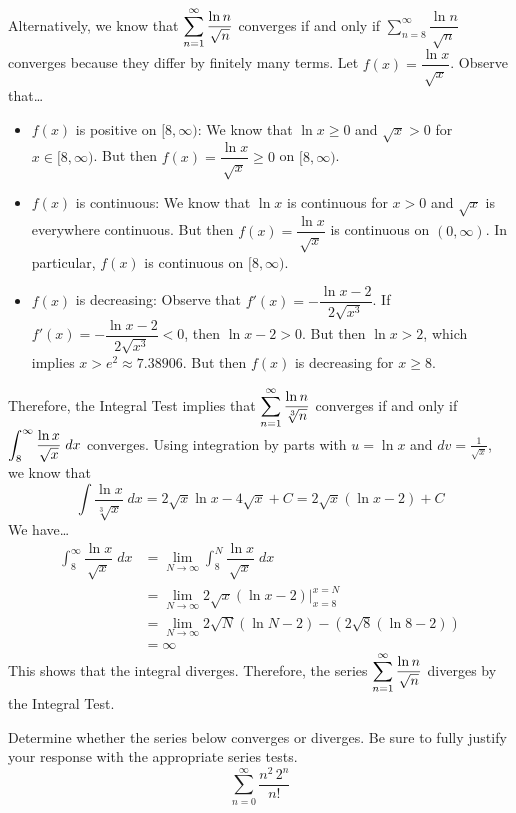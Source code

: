 \documentclass[12pt,letterpaper]{exam}
\begin{document}
\begin{questions}
{Alternatively, we know that $\displaystyle\sum_{n=1}^\infty \dfrac{\ln n}{\sqrt{n}}$ converges if and only if $\sum_{n=8}^\infty \dfrac{\ln n}{\sqrt{n}}$ converges because they differ by finitely many terms. Let $f(x)= \dfrac{\ln x}{\sqrt{x}}$. Observe that\dots
	\begin{itemize}
	\item $f(x)$ is positive on $[8, \infty)$: We know that $\ln x \geq 0$ and $\sqrt{x} > 0$ for $x \in [8, \infty)$. But then $f(x)= \dfrac{\ln x}{\sqrt{x}} \geq 0$ on $[8, \infty)$.
	\item $f(x)$ is continuous: We know that $\ln x$ is continuous for $x > 0$ and $\sqrt{x}$ is everywhere continuous. But then $f(x)= \dfrac{\ln x}{\sqrt{x}}$ is continuous on $(0, \infty)$. In particular, $f(x)$ is continuous on $[8, \infty)$. 
	\item $f(x)$ is decreasing: Observe that $f'(x)= -\dfrac{\ln x - 2}{2 \sqrt{x^3}}$. If $f'(x)= -\dfrac{\ln x - 2}{2 \sqrt{x^3}} < 0$, then $\ln x - 2 > 0$. But then $\ln x > 2$, which implies $x > e^2 \approx 7.38906$. But then $f(x)$ is decreasing for $x \geq 8$.
	\end{itemize}
Therefore, the Integral Test implies that $\displaystyle\sum_{n=1}^\infty \dfrac{\ln n}{\sqrt[3]{n}}$ converges if and only if $\displaystyle\int_{8}^\infty \dfrac{\ln x}{\sqrt{x}} \;dx$ converges. Using integration by parts with $u= \ln x$ and $dv= \frac{1}{\sqrt{x}}$, we know that
	\[
	\int \dfrac{\ln x}{\sqrt[3]{x}} \;dx= 2 \sqrt{x} \ln x - 4 \sqrt{x} + C= 2 \sqrt{x} (\ln x - 2) + C
	\]
We have\dots
	\[
	\begin{aligned}
	\int_{8}^\infty \dfrac{\ln x}{\sqrt{x}} \;dx&= \lim_{N \to \infty} \int_{8}^N \dfrac{\ln x}{\sqrt{x}} \;dx \\
	&= \lim_{N \to \infty} 2 \sqrt{x} (\ln x - 2) \bigg|_{x=8}^{x=N} \\
	&= \lim_{N \to \infty} 2 \sqrt{N} (\ln N - 2) - \left( 2 \sqrt{8} (\ln 8 - 2) \right) \\
	&= \infty
	\end{aligned}
	\]
This shows that the integral diverges. Therefore, the series $\displaystyle\sum_{n=1}^\infty \dfrac{\ln n}{\sqrt{n}}$ diverges by the Integral Test.} 



\newpage
\question[10] Determine whether the series below converges or diverges. Be sure to fully justify your response with the appropriate series tests.
	\[
	\sum_{n=0}^\infty \dfrac{n^2 \, 2^n}{n!}
	\] \pspace


\end{questions}
\end{document}
